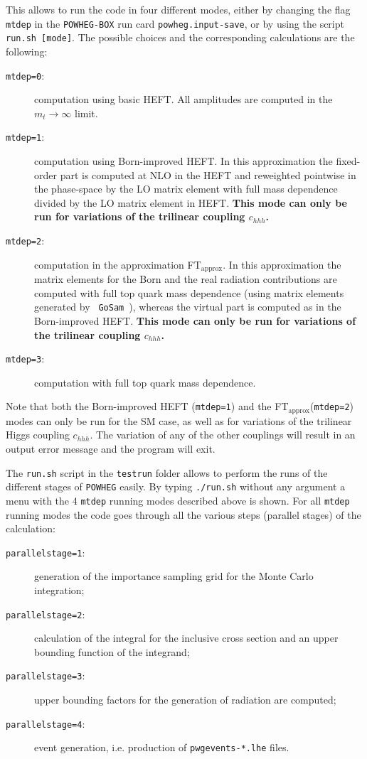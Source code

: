 \documentclass[paper]{JHEP3}
\newcommand\POWHEG{{\tt POWHEG}}
\newcommand\POWHEGBOX{{\tt POWHEG-BOX}}
\newcommand\ftapprox{FT$_{\mathrm{approx}}$\xspace}
\begin{document}
This allows to run the code in four different modes, either by
changing the flag {\tt mtdep} in the \POWHEGBOX{} run card {\tt powheg.input-save}, or by using the script {\tt run.sh [mode]}.
The possible choices and the corresponding calculations are the following:
\begin{description}
 \item[{\tt mtdep=0}:]{computation using basic HEFT. All amplitudes
   are computed in the $m_t\to\infty$ limit.}
 \item[{\tt mtdep=1}:]{computation using Born-improved HEFT. In this
   approximation the fixed-order part is computed at NLO in the HEFT
   and reweighted pointwise in the phase-space by the LO matrix
   element with full mass dependence divided by the LO matrix
   element in HEFT. \textbf{This mode can only be run for variations of 
   the trilinear coupling $c_{hhh}$.}}
 \item[{\tt mtdep=2}:]{computation in the approximation \ftapprox. In
   this approximation the matrix elements for the Born and the real
   radiation contributions are computed with full top quark mass dependence
   (using matrix elements generated by {\tt
     GoSam}~\cite{Cullen:2014yla}), whereas the virtual part is
   computed as in the Born-improved HEFT. \textbf{This mode can only be run for variations of 
   the trilinear coupling $c_{hhh}$.}}
 \item[{\tt mtdep=3}:]{computation with full top quark mass dependence.}
\end{description}

Note that both the Born-improved HEFT ({\tt mtdep=1}) and the \ftapprox ({\tt mtdep=2}) modes can only be run for the
SM case, as well as for variations of the trilinear Higgs coupling $c_{hhh}$. The variation of
any of the other couplings will result in an output error message and the program will exit.

The {\tt run.sh} script in the {\tt testrun} folder allows to perform 
the runs of the different stages of \POWHEG{} easily.
By typing {\tt ./run.sh} without any argument a menu with the
4 {\tt mtdep} running modes described above is shown. 
For all {\tt mtdep} running modes the code goes through all
the various steps (parallel stages) of the calculation: 
\begin{description}
 \item[{\tt parallelstage=1}:]
generation of the importance sampling grid for the Monte Carlo integration; 
 \item[{\tt parallelstage=2}:] calculation of the integral for the inclusive cross section and an upper bounding function of the integrand;
 \item[{\tt parallelstage=3}:] upper bounding factors for the generation of radiation are computed;
 \item[{\tt parallelstage=4}:] event generation, i.e. production of {\tt pwgevents-*.lhe} files.
\end{description}
\end{document}
